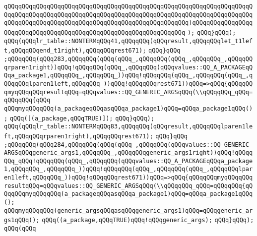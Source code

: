 \verb|qQQqqQQqqQQqqQQqqQQqqQQqqQQqqQQqqQQqqQQqqQQqqQQqqQQqqQQqqQQqqQQqqQQqqQQqqQQqqQQqqQQqqQQqqQQqqQQqqQQqqQQqqQQqqQQqqQQqqQQqqQQqqQQqqQQqqQQqqQQqqQQqqQQqqQQqqQQqqQQqqQQqqQQqqQQqqQQqqQQqqQQqqQQqqQQq)qQQqqQQqqQQqqQQqqQQqqQQqqQQqqQQqqQQqqQQqqQQqqQQqqQQqqQQqqQQqqQQqqQQq|\newline
\verb|);|\newline
\verb|qQQq}qQQq);|\newline
\verb|qQQq(qQQqlr_table::NONTERMqQQq41,qQQqqQQq(qQQqresult,qQQqqQQqlet_t1left,qQQqqQQqend_t1right),qQQqqQQqrest671);|\newline
\verb|qQQq}qQQq|\newline
\verb|;qQQqqQQq(qQQq283,qQQqqQQq(qQQq(qQQq_,qQQqqQQq(qQQq_,qQQqqQQq_,qQQqqQQqrparen1right))qQQq!qQQqqQQq(qQQq_,qQQqqQQq(qQQqvalues::QQ_A_PACKAGEqQQqa_package1,qQQqqQQq_,qQQqqQQq_))qQQq!qQQqqQQq(qQQq_,qQQqqQQq(qQQq_,qQQqqQQqlparen1left,qQQqqQQq_))qQQq!qQQqqQQqrest671))qQQq=>qQQq{qQQqqQQqmyqQQqqQQqresultqQQq=qQQqvalues::QQ_GENERIC_ARGSqQQq(\\qQQqqQQq_qQQq=qQQqqQQq{qQQq|\newline
\verb|qQQqmyqQQqqQQq(a_packageqQQqasqQQqa_package1)qQQq=qQQqa_package1qQQq();|\newline
\verb|qQQq([(a_package,qQQqTRUE)]);|\newline
\verb|qQQq}qQQq);|\newline
\verb|qQQq(qQQqlr_table::NONTERMqQQq83,qQQqqQQq(qQQqresult,qQQqqQQqlparen1left,qQQqqQQqrparen1right),qQQqqQQqrest671);|\newline
\verb|qQQq}qQQq|\newline
\verb|;qQQqqQQq(qQQq284,qQQqqQQq(qQQq(qQQq_,qQQqqQQq(qQQqvalues::QQ_GENERIC_ARGSqQQqgeneric_args1,qQQqqQQq_,qQQqqQQqgeneric_args1right))qQQq!qQQqqQQq_qQQq!qQQqqQQq(qQQq_,qQQqqQQq(qQQqvalues::QQ_A_PACKAGEqQQqa_package1,qQQqqQQq_,qQQqqQQq_))qQQq!qQQqqQQq(qQQq_,qQQqqQQq(qQQq_,qQQqqQQqlparen1left,qQQqqQQq_))qQQq!qQQqqQQqrest671))qQQq=>qQQq{qQQqqQQqmyqQQqqQQq|\newline
\verb|resultqQQq=qQQqvalues::QQ_GENERIC_ARGSqQQq(\\qQQqqQQq_qQQq=qQQqqQQq{qQQqqQQqmyqQQqqQQq(a_packageqQQqasqQQqa_package1)qQQq=qQQqa_package1qQQq();|\newline
\verb|qQQqmyqQQqqQQq(generic_argsqQQqasqQQqgeneric_args1)qQQq=qQQqgeneric_args1qQQq();|\newline
\verb|qQQq((a_package,qQQqTRUE)qQQq!qQQqgeneric_args);|\newline
\verb|qQQq}qQQq);|\newline
\verb|qQQq(qQQq|\newline
